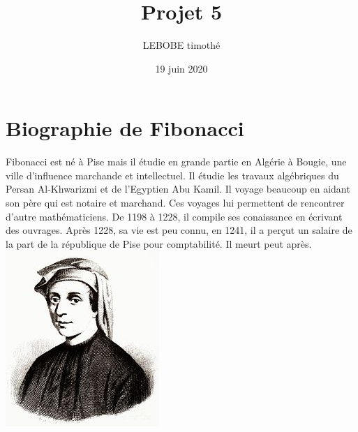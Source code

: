 \documentclass{article}
\title{Projet 5}
\author{LEBOBE timothé}
\date{19 juin 2020}
\begin{document}
    \maketitle
    \tableofcontents

    \section{Biographie de Fibonacci}
        Fibonacci est né à Pise mais il étudie en grande partie en Algérie à Bougie, une ville d'influence marchande et intellectuel.
        Il étudie les travaux algébriques du Persan Al-Khwarizmi et de l'Egyptien Abu Kamil. Il voyage beaucoup en aidant son père qui est
        notaire et marchand. Ces voyages lui permettent de rencontrer d'autre mathématiciens. De 1198 à 1228, il compile ses conaissance 
        en écrivant des ouvrages. Après 1228, sa vie est peu connu, en 1241, il a perçut un salaire de la part de la république de Pise
        pour comptabilité. Il meurt peut après.\\
        \includegraphics{Fibonacci_portrait.jpg}
\end{document}
